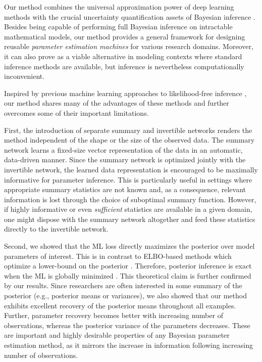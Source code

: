 \documentclass[9pt,twoside,lineno]{pnas-new}
\begin{document}
Our method combines the universal approximation power of deep learning methods \cite{goodfellow2016deep} with the crucial uncertainty quantification assets of Bayesian inference \cite{kendall2017uncertainties, gelman2013bayesian}. Besides being capable of performing full Bayesian inference on intractable mathematical models, our method provides a general framework for designing reusable \textit{parameter estimation machines} for various research domains. Moreover, it can also prove as a viable alternative in modeling contexts where standard inference methods are available, but inference is nevertheless computationally inconvenient. 

Inspired by previous machine learning approaches to likelihood-free inference \cite{radev2019towards, hwang2018conditional, mestdagh2018prepaid, raynal2018abc, jiang2017learning, lueckmann2017flexible, papamakarios2016fast}, our method shares many of the advantages of these methods and further overcomes some of their important limitations. 

First, the introduction of separate summary and invertible networks renders the method independent of the shape or the size of the observed data. The summary network learns a fixed-size vector representation of the data in an automatic, data-driven manner. Since the summary network is optimized jointly with the invertible network, the learned data representation is encouraged to be maximally informative for parameter inference. This is particularly useful in settings where appropriate summary statistics are not known and, as a consequence, relevant information is lost through the choice of suboptimal summary function. However, if highly informative or even \textit{sufficient} statistics are available in a given domain, one might dispose with the summary network altogether and feed these statistics directly to the invertible network.

Second, we showed that the ML loss directly maximizes the posterior over model parameters of interest. This is in contrast to ELBO-based methods which optimize a lower-bound on the posterior \cite{papamakarios2016fast, kingma2014auto}. Therefore, posterior inference is exact when the ML is globally minimized \cite{kingma2018glow, dinh2016density}. This theoretical claim is further confirmed by our results. Since researchers are often interested in some summary of the posterior (e.g., posterior means or variances), we also showed that our method exhibits excellent recovery of the posterior means throughout all examples. Further, parameter recovery becomes better with increasing number of observations, whereas the posterior variance of the parameters decreases. These are important and highly desirable properties of any Bayesian parameter estimation method, as it mirrors the increase in information following increasing number of observations. 
\end{document}
